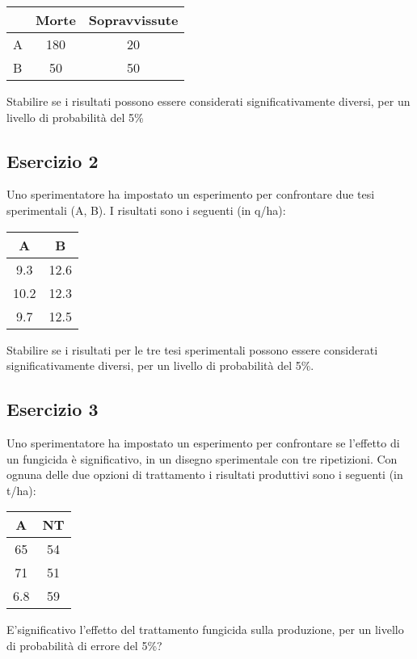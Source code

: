 \documentclass[a4paper,12pt,oneside]{book}
\begin{document}
\begin{longtable}[]{@{}lcc@{}}
\toprule
& Morte & Sopravvissute \\
\midrule
\endhead
A & 180 & 20 \\
B & 50 & 50 \\
\bottomrule
\end{longtable}

Stabilire se i risultati possono essere considerati significativamente diversi, per un livello di probabilità del 5\%

\hypertarget{esercizio-2-3}{%
\subsection{Esercizio 2}\label{esercizio-2-3}}

Uno sperimentatore ha impostato un esperimento per confrontare due tesi sperimentali (A, B). I risultati sono i seguenti (in q/ha):

\begin{longtable}[]{@{}cc@{}}
\toprule
A & B \\
\midrule
\endhead
9.3 & 12.6 \\
10.2 & 12.3 \\
9.7 & 12.5 \\
\bottomrule
\end{longtable}

Stabilire se i risultati per le tre tesi sperimentali possono essere considerati significativamente diversi, per un livello di probabilità del 5\%.

\hypertarget{esercizio-3-3}{%
\subsection{Esercizio 3}\label{esercizio-3-3}}

Uno sperimentatore ha impostato un esperimento per confrontare se l'effetto di un fungicida è significativo, in un disegno sperimentale con tre ripetizioni. Con ognuna delle due opzioni di trattamento i risultati produttivi sono i seguenti (in t/ha):

\begin{longtable}[]{@{}cc@{}}
\toprule
A & NT \\
\midrule
\endhead
65 & 54 \\
71 & 51 \\
6.8 & 59 \\
\bottomrule
\end{longtable}

E'significativo l'effetto del trattamento fungicida sulla produzione, per un livello di probabilità di errore del 5\%?
\end{document}
